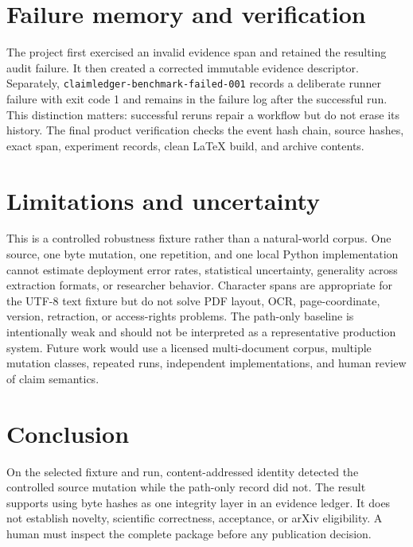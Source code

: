 \documentclass[11pt]{article}
\begin{document}
\section{Failure memory and verification}
The project first exercised an invalid evidence span and retained the resulting audit failure. It then created a corrected immutable evidence descriptor. Separately, \texttt{claimledger-benchmark-failed-001} records a deliberate runner failure with exit code 1 and remains in the failure log after the successful run. This distinction matters: successful reruns repair a workflow but do not erase its history. The final product verification checks the event hash chain, source hashes, exact span, experiment records, clean LaTeX build, and archive contents.

\section{Limitations and uncertainty}
This is a controlled robustness fixture rather than a natural-world corpus. One source, one byte mutation, one repetition, and one local Python implementation cannot estimate deployment error rates, statistical uncertainty, generality across extraction formats, or researcher behavior. Character spans are appropriate for the UTF-8 text fixture but do not solve PDF layout, OCR, page-coordinate, version, retraction, or access-rights problems. The path-only baseline is intentionally weak and should not be interpreted as a representative production system. Future work would use a licensed multi-document corpus, multiple mutation classes, repeated runs, independent implementations, and human review of claim semantics.

\section{Conclusion}
On the selected fixture and run, content-addressed identity detected the controlled source mutation while the path-only record did not. The result supports using byte hashes as one integrity layer in an evidence ledger. It does not establish novelty, scientific correctness, acceptance, or arXiv eligibility. A human must inspect the complete package before any publication decision.




\end{document}
